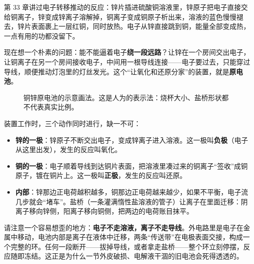 第 33 章讲过电子转移推动的反应：锌片插进硫酸铜溶液里，锌原子把电子直接交给铜离子，锌变成锌离子溶解掉，铜离子变成铜原子析出来，溶液的蓝色慢慢褪去，锌片表面裹上一层红铜，同时放热。电子从锌直接跳到铜，能量全部变成热，一点有用的功都没留下。

现在想一个朴素的问题：能不能逼着电子\textbf{绕一段远路}？让锌在一个房间交出电子，让铜离子在另一个房间接收电子，中间用一根导线连接——电子要过去，只能穿过导线，顺便推动灯泡里的灯丝发光。这个“让氧化和还原分家”的装置，就是\textbf{原电池}。

\begin{figure}[htbp]
\centering
{}
\caption{铜锌原电池的示意画法。这是人为的表示法：烧杯大小、盐桥形状都不代表真实比例。}
\end{figure}

装置工作时，三个动作同时进行，缺一不可：

\begin{itemize}[itemsep=2pt]
\item \textbf{锌的一极}：锌原子不断交出电子，变成锌离子进入溶液。这一极叫\textbf{负极}（电子从这里出发），发生的反应叫氧化。
\item \textbf{铜的一极}：电子顺着导线到达铜片表面，把溶液里凑过来的铜离子“签收”成铜原子，镀在铜片上。这一极叫\textbf{正极}，发生的反应叫还原。
\item \textbf{内部}：锌那边正电荷越积越多，铜那边正电荷越来越少，如果不平衡，电子流几步就会“堵车”。盐桥（一条灌满惰性盐溶液的管子）让离子在里面迁移：阴离子移向锌侧，阳离子移向铜侧，把两边的电荷账目抹平。
\end{itemize}

请注意一个容易想歪的地方：\textbf{电子不走溶液，离子不走导线}。外电路里是电子在金属中移动，电池内部是离子在液体中迁移，两条“传送带”在电极表面交接，构成一个完整的环。任何一段断开——拔掉导线，或者拿走盐桥——整个环立刻停摆，反应随即冻结。这正是为什么一节外皮破损、电解液干涸的旧电池会死得透透的。

